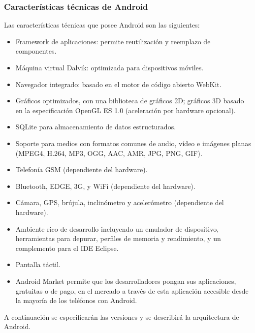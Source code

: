 \documentclass[12 pt, a4paper, twoside]{article}
\begin{document}
\subsubsection{Características técnicas de Android}
Las características técnicas que posee Android son las siguientes:
\begin{itemize}
\item Framework de aplicaciones: permite reutilización y reemplazo de
  componentes.
\item Máquina virtual Dalvik: optimizada para dispositivos móviles.
\item Navegador integrado: basado en el motor de código abierto
  WebKit.
\item Gráficos optimizados, con una biblioteca de gráficos 2D; gráficos 3D basado
en la especificación OpenGL ES 1.0 (aceleración por hardware
opcional).
\item SQLite para almacenamiento de datos estructurados.
\item Soporte para medios con formatos comunes de audio, vídeo e imágenes
planas (MPEG4, H.264, MP3, OGG, AAC, AMR, JPG, PNG, GIF).
\item Telefonía GSM (dependiente del hardware).
\item Bluetooth, EDGE, 3G, y WiFi (dependiente del hardware).
\item Cámara, GPS, brújula, inclinómetro y acelerómetro (dependiente del
hardware).
\item Ambiente rico de desarrollo incluyendo un emulador de dispositivo, herramientas
para depurar, perfiles de memoria y rendimiento, y un complemento
para el IDE Eclipse.
\item Pantalla táctil.
\item Android Market permite que los desarrolladores pongan sus aplicaciones,
gratuitas o de pago, en el mercado a través de esta aplicación accesible desde
la mayoría de los teléfonos con Android.
\end{itemize}

A continuación se especificarán las versiones y se describirá la
arquitectura de Android.
\end{document}
